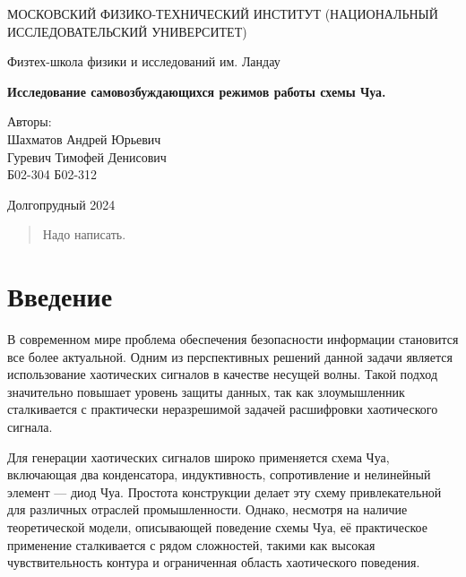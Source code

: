 \documentclass[12pt]{article}
\date{\today}
\begin{document}
\begin{titlepage}
	\begin{center}
		{\large МОСКОВСКИЙ ФИЗИКО-ТЕХНИЧЕСКИЙ ИНСТИТУТ (НАЦИОНАЛЬНЫЙ ИССЛЕДОВАТЕЛЬСКИЙ УНИВЕРСИТЕТ)}
	\end{center}
	\begin{center}
		{\large Физтех-школа физики и исследований им. Ландау}
	\end{center}

	\vspace{3cm}
	{\huge
		\begin{center}
			\textbf{Исследование самовозбуждающихся режимов работы схемы Чуа.}
		\end{center}
	}
	\vspace{2cm}
	\begin{flushright}
		{\LARGE Авторы:\\ Шахматов Андрей Юрьевич \\ Гуревич Тимофей Денисович \\
			\vspace{0.2cm}
			Б02-304 \vspace{0.2cm} Б02-312}
	\end{flushright}
	\vspace{7 cm}
	\begin{center}
		Долгопрудный 2024
	\end{center}
	\thispagestyle{empty}
\end{titlepage}


\begin{abstract}
	Надо написать.
\end{abstract}


\section*{Введение}
В современном мире проблема обеспечения безопасности информации становится все более актуальной.
Одним из перспективных решений данной задачи является использование хаотических сигналов в качестве несущей волны.
Такой подход значительно повышает уровень защиты данных,
так как злоумышленник сталкивается с практически неразрешимой задачей расшифровки хаотического сигнала.

Для генерации хаотических сигналов широко применяется схема Чуа, включающая два конденсатора,
индуктивность, сопротивление и нелинейный элемент --- диод Чуа.
Простота конструкции делает эту схему привлекательной для различных отраслей промышленности.
Однако, несмотря на наличие теоретической модели, описывающей поведение схемы Чуа,
её практическое применение сталкивается с рядом сложностей, такими как высокая чувствительность контура и
ограниченная область хаотического поведения.
\end{document}
